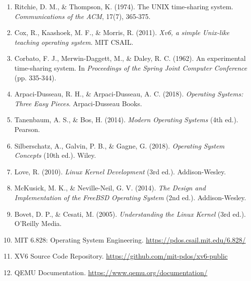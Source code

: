 \documentclass[a4paper,12pt]{report}
\begin{document}
\begin{enumerate}
    \item Ritchie, D. M., \& Thompson, K. (1974). The UNIX time-sharing system. \textit{Communications of the ACM}, 17(7), 365-375.
    
    \item Cox, R., Kaashoek, M. F., \& Morris, R. (2011). \textit{Xv6, a simple Unix-like teaching operating system}. MIT CSAIL.
    
    \item Corbato, F. J., Merwin-Daggett, M., \& Daley, R. C. (1962). An experimental time-sharing system. In \textit{Proceedings of the Spring Joint Computer Conference} (pp. 335-344).
    
    \item Arpaci-Dusseau, R. H., \& Arpaci-Dusseau, A. C. (2018). \textit{Operating Systems: Three Easy Pieces}. Arpaci-Dusseau Books.
    
    \item Tanenbaum, A. S., \& Bos, H. (2014). \textit{Modern Operating Systems} (4th ed.). Pearson.
    
    \item Silberschatz, A., Galvin, P. B., \& Gagne, G. (2018). \textit{Operating System Concepts} (10th ed.). Wiley.
    
    \item Love, R. (2010). \textit{Linux Kernel Development} (3rd ed.). Addison-Wesley.
    
    \item McKusick, M. K., \& Neville-Neil, G. V. (2014). \textit{The Design and Implementation of the FreeBSD Operating System} (2nd ed.). Addison-Wesley.
    
    \item Bovet, D. P., \& Cesati, M. (2005). \textit{Understanding the Linux Kernel} (3rd ed.). O'Reilly Media.
    
    \item MIT 6.828: Operating System Engineering. \url{https://pdos.csail.mit.edu/6.828/}
    
    \item XV6 Source Code Repository. \url{https://github.com/mit-pdos/xv6-public}
    
    \item QEMU Documentation. \url{https://www.qemu.org/documentation/}
\end{enumerate}
\end{document}

